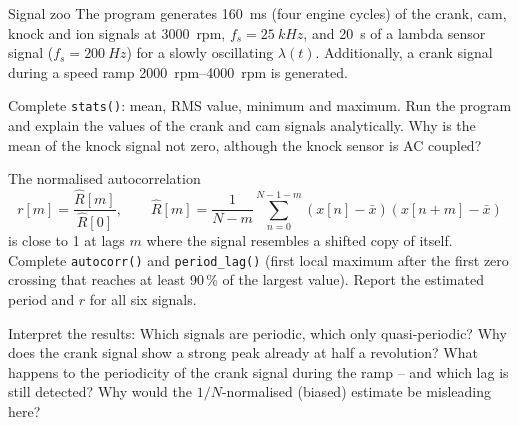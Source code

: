 \begin{exercise}{Signal zoo}{\JSLinux}
The program  generates \SI{160}{ms}
(four engine cycles) of the crank, cam, knock and ion signals at
\SI{3000}{rpm}, $f_s=\SI{25}{kHz}$, and \SI{20}{s} of a lambda sensor signal
($f_s=\SI{200}{Hz}$) for a slowly oscillating $\lambda(t)$. Additionally, a crank
signal during a speed ramp \SIrange{2000}{4000}{rpm} is generated.
\begin{tasks}
  \item Complete \texttt{stats()}: mean, RMS value, minimum and maximum. Run
    the program and explain the values of the crank and cam signals
    analytically. Why is the mean of the knock signal not zero, although the
    knock sensor is AC coupled?
  \item The normalised autocorrelation
    \[ r[m] = \frac{\hat R[m]}{\hat R[0]},\qquad
       \hat R[m]=\frac{1}{N-m}\sum_{n=0}^{N-1-m}(x[n]-\bar x)(x[n+m]-\bar x) \]
    is close to 1 at lags $m$ where the signal resembles a shifted copy of
    itself. Complete \texttt{autocorr()} and \texttt{period\_lag()} (first local
    maximum after the first zero crossing that reaches at least 90\,\% of the
    largest value). Report the estimated period and $r$ for all six signals.
  \item Interpret the results: Which signals are periodic, which only
    quasi-periodic? Why does the crank signal show a strong peak already at
    half a revolution? What happens to the periodicity of the crank signal
    during the ramp -- and which lag is still detected? Why would the
    $1/N$-normalised (biased) estimate be misleading here?
\end{tasks}
\end{exercise}

